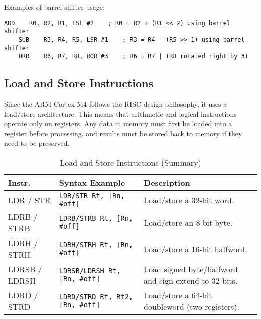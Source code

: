 \noindent Examples of barrel shifter usage:
\begin{lstlisting}[caption={Barrel shifter examples}]
    ADD    R0, R2, R1, LSL #2    ; R0 = R2 + (R1 << 2) using barrel shifter
    SUB    R3, R4, R5, LSR #1    ; R3 = R4 - (R5 >> 1) using barrel shifter
    ORR    R6, R7, R8, ROR #3    ; R6 = R7 | (R8 rotated right by 3)
\end{lstlisting}

\subsection{Load and Store Instructions}
Since the ARM Cortex-M4 follows the RISC design philosophy, it uses a load/store architecture.
This means that arithmetic and logical instructions operate only on registers.
Any data in memory must first be loaded into a register before processing, and results must be stored back to memory if they need to be preserved.

\begin{table}[H]
\centering
\caption{Load and Store Instructions (Summary)}
\small
\begin{tabularx}{\linewidth}{@{}l l X@{}}
\toprule
\textbf{Instr.} & \textbf{Syntax Example} & \textbf{Description} \\
\midrule
LDR / STR       & \texttt{LDR/STR Rt, [Rn, \#off]} & Load/store a 32-bit word. \\
LDRB / STRB     & \texttt{LDRB/STRB Rt, [Rn, \#off]} & Load/store an 8-bit byte. \\
LDRH / STRH     & \texttt{LDRH/STRH Rt, [Rn, \#off]} & Load/store a 16-bit halfword. \\
LDRSB / LDRSH   & \texttt{LDRSB/LDRSH Rt, [Rn, \#off]} & Load signed byte/halfword and sign-extend to 32 bits. \\
LDRD / STRD     & \texttt{LDRD/STRD Rt, Rt2, [Rn, \#off]} & Load/store a 64-bit doubleword (two registers). \\
\bottomrule
\end{tabularx}
\vspace{2pt}
\end{table}


